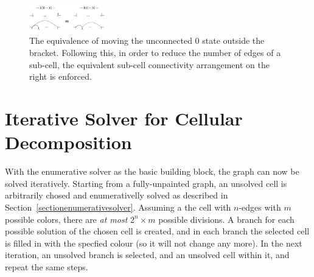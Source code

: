 \documentclass[journal]{IEEEtran}
\begin{document}
\begin{figure}[t]
\centering
\includegraphics[width = 0.3\textwidth]{figures/proof/equiv_zero}
\caption{The equivalence of moving the unconnected $0$ state outside the bracket. Following this, in order to reduce the number of edges of a sub-cell, the equivalent sub-cell connectivity arrangement on the right is enforced.}
\label{figconstraint}
\end{figure} 


\section{Iterative Solver for Cellular Decomposition}
\label{sectioniterativesolver}

With the enumerative solver as the basic building block, the graph can now be solved iteratively.
Starting from a fully-unpainted graph, an unsolved cell is arbitrarily chosed and enumerativelly solved as 
described in Section~\ref{sectionenumerativesolver}. %
Assuming a the cell with $n$-edges with $m$ possible colors, there are \textit{at most} $2^n\times m$ possible divisions. A branch for each possible solution of the chosen cell is created, and in each branch the selected cell is filled in with the specfied colour (so it will not change any more). 
In the next iteration, an unsolved branch is selected, and an unsolved cell within it, and repeat the same steps.
 
\end{document}

